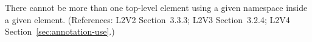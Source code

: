 There cannot be more than one top-level element using a given namespace
inside a given  element.  (References: L2V2 Section~3.3.3;
L2V3 Section~3.2.4; L2V4 Section~\ref{sec:annotation-use}.)

